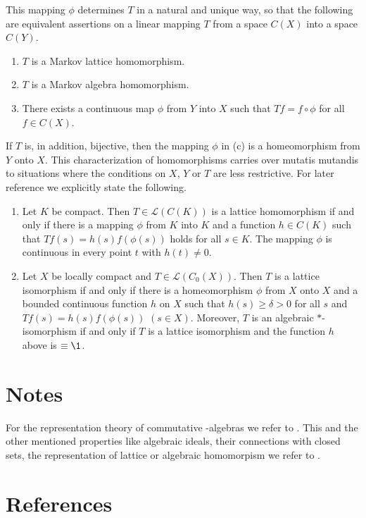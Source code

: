 This mapping $\phi$ determines $T$ in a natural and unique way, so that the following are equivalent assertions on a linear mapping $T$ from a space $C(X)$ into a space $C(Y)$.
\begin{enumerate}[\upshape (a)]
\item 
	$T$ is a Markov lattice homomorphism.
\item 
	$T$ is a Markov algebra homomorphism.
\item 
	There exists a continuous map $\phi$ from $Y$ into $X$ such that $Tf = f \circ \phi$ for all $f \in 	C(X)$.
\end{enumerate}
If $T$ is, in addition, bijective, then the mapping $\phi$ in (c) is a homeomorphism from $Y$ onto $X$.
This characterization of homomorphisms carries over mutatis mutandis to situations where the conditions on $X$, $Y$ or $T$ are less restrictive.
For later reference we explicitly state the following.
\begin{enumerate}[\upshape (i), wide, labelindent=.5em]
\item 
	Let $K$ be compact. Then $ T \in \mathcal{L}(C(K)) $ is a lattice homomorphism if and only if there is a mapping 
$\phi$ from $K$ into $K$ and a function $h \in C(K)$ such that $Tf(s) = h(s)f(\phi(s))$ holds for all $s \in K$.
The mapping $\phi$ is continuous in every point $t$ with $h(t) \neq 0$.

\item 
	Let $X$ be locally compact and $T \in \mathcal{L}(C_{0}(X))$.
Then $T$ is a lattice isomorphism if and only if there is a homeomorphism $\phi$ from $X$ onto $X$ and a bounded continuous function $h$ on $X$ such that $h(s) \geq \delta > 0$ for all $s$ and $Tf(s) = h(s)f(\phi(s))$ $(s \in X)$.
Moreover, $T$ is an algebraic $*$-isomorphism if and only if $T$ is a lattice isomorphism and the function $h$ above is $\equiv \1$.
\end{enumerate}

\section*{Notes}
For the representation theory of commutative \CA-algebras we refer to \citet{takesaki:1979}. 
This and the other mentioned properties like algebraic ideals, their connections with closed sets, the representation of lattice or algebraic homomorpism \etc we refer to \citet{semadeni:1971}.


\section*{References}
{\RaggedRight
\renewcommand{\bibsection}{}

}
